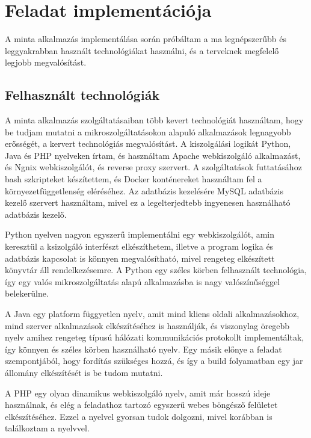 \documentclass[11pt,magyar,a4paper,twoside,]{report}
\begin{document}
\chapter{Feladat implementációja}\label{feladat-implementuxe1ciuxf3ja}

A minta alkalmazás implementálása során próbáltam a ma legnépszerűbb és
leggyakrabban használt technológiákat használni, és a terveknek
megfelelő legjobb megvalósítást.

\section{Felhasznált
technológiák}\label{felhasznuxe1lt-technoluxf3giuxe1k}

A minta alkalmazás szolgáltatásaiban több kevert technológiát
használtam, hogy be tudjam mutatni a mikroszolgáltatásokon alapuló
alkalmazások legnagyobb erősségét, a kervert technológiás megvalósítást.
A kiszolgálási logikát Python, Java és PHP nyelveken írtam, és
használtam Apache webkiszolgáló alkalmazást, és Ngnix webkiszolgálót, és
reverse proxy szervert. A szolgáltatások futtatásához bash szkripteket
készítettem, és Docker konténereket használtam fel a
környezetfüggetlenség eléréséhez. Az adatbázis kezelésére MySQL
adatbázis kezelő szervert használtam, mivel ez a legelterjedtebb
ingyenesen használható adatbázis kezelő.

Python nyelven nagyon egyszerű implementálni egy webkiszolgálót, amin
keresztül a ksizolgáló interfészt elkészíthetem, illetve a program
logika és adatbázis kapcsolat is könnyen megvalósítható, mivel rengeteg
elkészített könyvtár áll rendelkezésemre. A Python egy széles körben
felhasznált technológia, így egy valós mikroszolgáltatás alapú
alkalmazásba is nagy valószínűséggel belekerülne.

A Java egy platform függyetlen nyelv, amit mind kliens oldali
alkalmazásokhoz, mind szerver alkalmazások elkészítéséhez is használják,
és viszonylag öregebb nyelv amihez rengeteg típusú hálózati
kommunikációs protokollt implementáltak, így könnyen és széles körben
használható nyelv. Egy másik előnye a feladat szempontjából, hogy
fordítás szükséges hozzá, és így a build folyamatban egy jar állomány
elkészítését is be tudom mutatni.

A PHP egy olyan dinamikus webkiszolgáló nyelv, amit már hosszú ideje
használnak, és elég a feladathoz tartozó egyszerű webes böngésző
felületet elkészítéséhez. Ezzel a nyelvel gyorsan tudok dolgozni, mivel
korábban is találkoztam a nyelvvel.
\end{document}
